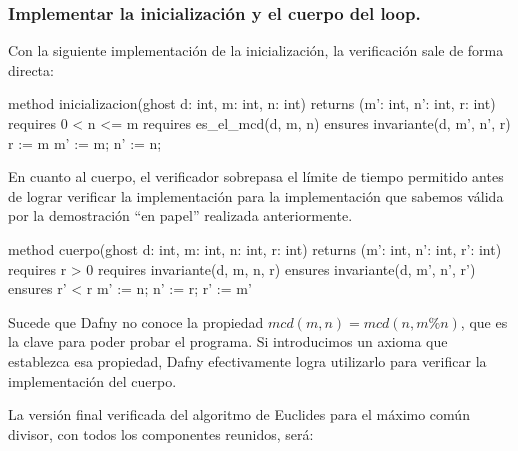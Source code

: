 \documentclass[12pt, a4paper, openany, fleqn]{book}
\begin{document}
    \subsubsection*{Implementar la inicialización y el cuerpo del loop.}

    Con la siguiente implementación de la inicialización, la verificación sale de forma directa:
    \begin{dafny}
method inicializacion(ghost d: int, m: int, n: int)
    returns (m': int, n': int, r: int)
    requires 0 < n <= m
    requires es_el_mcd(d, m, n)
    ensures invariante(d, m', n', r)
    {
        r := m %
        m' := m;
        n' := n;
    }
    \end{dafny}

    En cuanto al cuerpo, el verificador sobrepasa el límite de tiempo permitido antes de lograr verificar la implementación  para la implementación que sabemos válida por la demostración ``en papel'' realizada anteriormente.

    \begin{dafny}
method cuerpo(ghost d: int, m: int, n: int, r: int)
    returns (m': int, n': int, r': int)
    requires r > 0
    requires invariante(d, m, n, r)
    ensures invariante(d, m', n', r')
    ensures r' < r
{
    m' := n;
    n' := r;
    r' := m' %
}
    \end{dafny}

    Sucede que Dafny no conoce la propiedad $mcd(m, n) = mcd(n, m\%n)$, que es la clave para poder probar el programa. Si introducimos un axioma que establezca esa propiedad, Dafny efectivamente logra utilizarlo para verificar la implementación del cuerpo.


    La versión final verificada del algoritmo de Euclides para el máximo común divisor, con todos los componentes reunidos, será:

\end{document}
